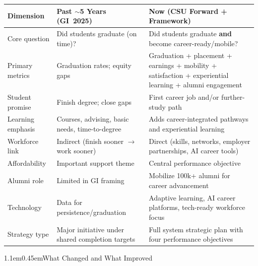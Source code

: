 \documentclass[11pt,letterpaper]{article}
\makeatletter
\renewcommand\section{\@startsection{section}{1}{\z@}%
  {1.1em}{0.45em}{\large\bfseries}}
\makeatother
\begin{document}
\begin{center}
\renewcommand{\arraystretch}{1.2}
\begin{tabularx}{\textwidth}{>{\raggedright\arraybackslash}p{} >{\raggedright\arraybackslash}X >{\raggedright\arraybackslash}X}
\toprule
\textbf{Dimension} & \textbf{Past $\sim$5 Years (GI~2025)} & \textbf{Now (CSU Forward + Framework)} \\
\midrule
Core question & Did students graduate (on time)? & Did students graduate \textbf{and} become career-ready/mobile? \\
\midrule
Primary metrics & Graduation rates; equity gaps & Graduation + placement + earnings + mobility + satisfaction + experiential learning + alumni engagement \\
\midrule
Student promise & Finish degree; close gaps & First career job and/or further-study path \\
\midrule
Learning emphasis & Courses, advising, basic needs, time-to-degree & Adds career-integrated pathways and experiential learning \\
\midrule
Workforce link & Indirect (finish sooner $\rightarrow$ work sooner) & Direct (skills, networks, employer partnerships, AI career tools) \\
\midrule
Affordability & Important support theme & Central performance objective \\
\midrule
Alumni role & Limited in GI framing & Mobilize 100k+ alumni for career advancement \\
\midrule
Technology & Data for persistence/graduation & Adaptive learning, AI career platforms, tech-ready workforce focus \\
\midrule
Strategy type & Major initiative under shared completion targets & Full system strategic plan with four performance objectives \\
\bottomrule
\end{tabularx}
\end{center}

\section{What Changed and What Improved}
\end{document}
